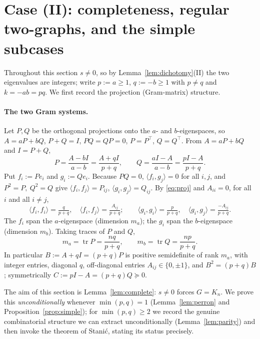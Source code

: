 \documentclass{amsart}
\theoremstyle{definition}
\begin{document}
\section{Case (II): completeness, regular two-graphs, and the simple
subcases}\label{sec:complete}

Throughout this section $s\ne0$, so by Lemma~\ref{lem:dichotomy}(II) the two
eigenvalues are integers; write $p:=a\ge1$, $q:=-b\ge1$ with $p\ne q$ and
$k=-ab=pq$. We first record the projection (Gram-matrix) structure.

\paragraph{The two Gram systems.}
Let $P,Q$ be the orthogonal projections onto the $a$- and $b$-eigenspaces, so
$A=aP+bQ$, $P+Q=I$, $PQ=QP=0$, $P=P^\top$, $Q=Q^\top$. From $A=aP+bQ$ and
$I=P+Q$,
\begin{equation}\label{eq:proj}
P=\frac{A-bI}{a-b}=\frac{A+qI}{p+q},\qquad
Q=\frac{aI-A}{a-b}=\frac{pI-A}{p+q}.
\end{equation}
Put $f_i:=Pe_i$ and $g_i:=Qe_i$. Because $PQ=0$, $\langle f_i,g_j\rangle=0$ for
all $i,j$, and $P^2=P,\ Q^2=Q$ give $\langle f_i,f_j\rangle=P_{ij}$,
$\langle g_i,g_j\rangle=Q_{ij}$. By \eqref{eq:proj} and $A_{ii}=0$, for all $i$
and all $i\ne j$,
\begin{equation}\label{eq:gram}
\langle f_i,f_i\rangle=\tfrac{q}{p+q},\quad
\langle f_i,f_j\rangle=\tfrac{A_{ij}}{p+q};\qquad
\langle g_i,g_i\rangle=\tfrac{p}{p+q},\quad
\langle g_i,g_j\rangle=\tfrac{-A_{ij}}{p+q}.
\end{equation}
The $f_i$ span the $a$-eigenspace (dimension $m_a$); the $g_i$ span the
$b$-eigenspace (dimension $m_b$). Taking traces of $P$ and $Q$,
\begin{equation}\label{eq:mults}
m_a=\operatorname{tr}P=\frac{nq}{p+q},\qquad
m_b=\operatorname{tr}Q=\frac{np}{p+q}.
\end{equation}
In particular $B:=A+qI=(p+q)P$ is positive semidefinite of rank $m_a$, with
integer entries, diagonal $q$, off-diagonal entries $A_{ij}\in\{0,\pm1\}$, and
$B^2=(p+q)B$; symmetrically $C:=pI-A=(p+q)Q\succeq0$.

The aim of this section is Lemma~\ref{lem:complete}: $s\ne0$ forces $G=K_n$. We
prove this \emph{unconditionally} whenever $\min(p,q)=1$
(Lemma~\ref{lem:perron} and Proposition~\ref{prop:simple}); for $\min(p,q)\ge2$
we record the genuine combinatorial structure we can extract unconditionally
(Lemma~\ref{lem:parity}) and then invoke the theorem of Stani\'c, stating its
status precisely.
\end{document}
